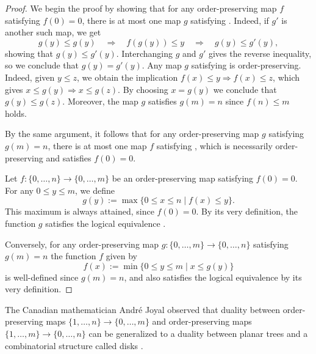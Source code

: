 \begin{proof}
  We begin the proof by showing that for any order-preserving map $f$ satisfying $f(0)=0$, there is at most one map $g$ satisfying . Indeed, if $g'$ is another such map, we get
  \begin{equation*}
    g(y)\leq g(y) \quad\Rightarrow\quad f(g(y))\leq y\quad\Rightarrow\quad g(y)\leq g'(y),
  \end{equation*}
  showing that $g(y)\leq g'(y)$. Interchanging $g$ and $g'$ gives the reverse inequality, so we conclude that $g(y)=g'(y)$. Any map $g$ satisfying  is order-preserving. Indeed, given $y\leq z$, we obtain the implication $f(x)\leq y\Rightarrow f(x)\leq z$, which gives $x\leq g(y)\Rightarrow x\leq g(z)$. By choosing $x=g(y)$ we conclude that $g(y)\leq g(z)$. Moreover, the map $g$ satisfies $g(m)=n$ since $f(n)\leq m$ holds.

  By the same argument, it follows that for any order-preserving map $g$ satisfying $g(m)=n$, there is at most one map $f$ satisfying , which is necessarily order-preserving and satisfies $f(0)=0$.

  Let $f:\{0,\ldots,n\}\to\{0,\ldots,m\}$ be an order-preserving map satisfying $f(0)=0$. For any $0\leq y\leq m$, we define
  \begin{equation*}
    g(y):=\max\{0\leq x\leq n\mid f(x)\leq y\}.
  \end{equation*}
  This maximum is always attained, since $f(0)=0$. By its very definition, the function $g$ satisfies the logical equivalence .

  Conversely, for any order-preserving map $g:\{0,\ldots,m\}\to\{0,\ldots,n\}$ satisfying $g(m)=n$ the function $f$ given by
 \begin{equation*}
   f(x):=\min\{0\leq y\leq m\mid x\leq g(y)\}
 \end{equation*}
 is well-defined since $g(m)=n$, and also satisfies the logical equivalence  by its very definition.
\end{proof}

\begin{remark}
  The Canadian mathematician Andr\'e Joyal observed that duality between order-preserving maps $\{1,\ldots,n\}\to\{0,\ldots,m\}$ and order-preserving maps $\{1,\ldots,m\}\to\{0,\ldots,n\}$ can be generalized to a duality between planar trees and a combinatorial structure called disks \cite{joyal1997}.
\end{remark}

